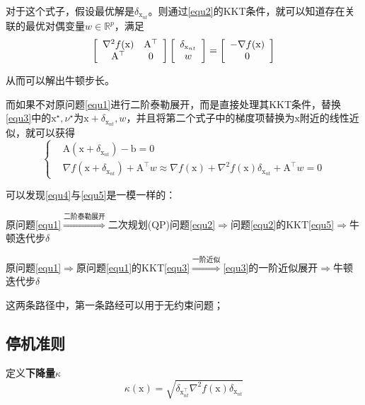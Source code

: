 \documentclass[a4paper]{D:/MyRepo/Script/latex/PaperReadingLog}
\begin{document}
对于这个式子，假设最优解是$\delta_{\mathrm{x}_{nt}}$。则通过\ref{equ2}的KKT条件，就可以知道存在关联的最优对偶变量$w\in\mathbb{R}^p$，满足
\begin{equation}
    \label{equ5}
    \left[
\begin{array}[]{cc}
    \nabla^2 f(\mathrm{x}) & \mathrm{A}^\top \\
    \mathrm{A}^\top & 0
\end{array}
\right]
\left[
\begin{array}[]{c}
    \delta_{\mathrm{x}_{nt}}\\
    w
\end{array}
\right]
=
\left[
\begin{array}[]{c}
    -\nabla f(\mathrm{x})\\
    0
\end{array}
\right]
\end{equation}


从而可以解出牛顿步长。

而如果不对原问题\ref{equ1}进行二阶泰勒展开，而是直接处理其KKT条件，替换\ref{equ3}中的$\mathrm{x}^\star,\nu^\star$为$\mathrm{x}+\delta_{\mathrm{x}_{nt}},w$，并且将第二个式子中的梯度项替换为$\mathrm{x}$附近的线性近似，就可以获得
\begin{equation}
    \label{equ4}
    \left\{
    \begin{aligned}
        &\mathrm{A}(\mathrm{x}+\delta_{\mathrm{x}_{nt}})-\mathrm{b}=0\\
        &\nabla f(\mathrm{x}+\delta_{\mathrm{x}_{nt}})+\mathrm{A}^\top w\approx \nabla f(\mathrm{x})+\nabla^2 f(\mathrm{x})\delta_{\mathrm{x}_{nt}}+\mathrm{A}^\top w=0
    \end{aligned}
    \right.
\end{equation}

可以发现\ref{equ4}与\ref{equ5}是一模一样的：

原问题\ref{equ1}$\stackrel{\text{二阶泰勒展开}}{\Rightarrow}$二次规划(QP)问题\ref{equ2}$\Rightarrow$问题\ref{equ2}的KKT\ref{equ5}$\Rightarrow$牛顿迭代步$\delta$

原问题\ref{equ1}$\Rightarrow$原问题\ref{equ1}的KKT\ref{equ3}$\stackrel{\text{一阶近似}}{\Rightarrow}$\ref{equ3}的一阶近似展开$\Rightarrow$牛顿迭代步$\delta$

这两条路径中，第一条路经可以用于无约束问题；

\subsection{停机准则}
定义\textbf{下降量}$\kappa$
$$
\kappa(\mathrm{x})=\sqrt{\delta_{\mathrm{x}_{nt}^\top} \nabla^2f(\mathrm{x})\delta_{\mathrm{x}_{nt}}}
$$
\end{document}
